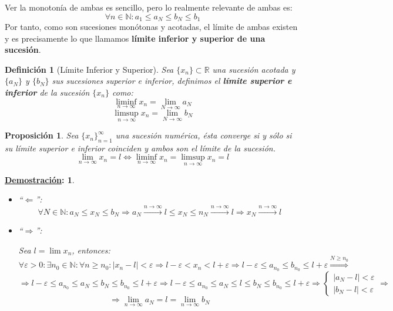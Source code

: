 \documentclass[10pt,a4paper,openright]{book}
\theoremstyle{break}
\newtheorem*{defi}{Definición}
\newtheorem*{prop}{Proposición}
\newtheorem*{demo}{\underline{Demostración}:}
\begin{document}
Ver la monotonía de ambas es sencillo, pero lo realmente relevante de ambas es:
$$\forall n\in \mathbb N: a_1\leq a_N\leq b_N\leq b_1$$
Por tanto, como son sucesiones monótonas y acotadas, el límite de ambas existen y es precisamente lo que llamamos \textbf{límite inferior y superior de una sucesión}.
\begin{defi}[Límite Inferior y Superior]
Sea $\{x_n\}\subset \mathbb R$ una sucesión acotada y $\{a_N\}$ y $\{b_N\}$ sus sucesiones superior e inferior, definimos el \textbf{límite superior e inferior} de la sucesión $\{x_n\}$ como:
$$\liminf_{n\rightarrow\infty}x_n=\lim_{N\rightarrow\infty}a_N$$
$$\limsup_{n\rightarrow\infty}x_n=\lim_{N\rightarrow\infty}b_N$$
\end{defi}

\begin{prop}
Sea $\{x_n\}_{n=1}^\infty$ una sucesión numérica, ésta converge si y sólo si su límite superior e inferior coinciden y ambos son el límite de la sucesión.
$$\lim_{n\rightarrow \infty}x_n=l\Leftrightarrow \liminf_{n\rightarrow\infty}x_n= \limsup_{n\rightarrow\infty}x_n=l$$
\end{prop}
\begin{demo}
\begin{itemize}
\item ``$\Leftarrow$'':
$$\forall N\in \mathbb N: a_N\leq x_N \leq b_N\Rightarrow a_N\xrightarrow{n\rightarrow\infty} l\leq x_N\leq n_N\xrightarrow{n\rightarrow\infty} l\Rightarrow x_N\xrightarrow{n\rightarrow\infty} l$$

\item ``$\Rightarrow$'':\par
Sea $l=\lim x_n$, entonces:
$$\forall \varepsilon>0: \exists n_0\in \mathbb N : \forall n\geq n_0: |x_n-l|<\varepsilon\Rightarrow l-\varepsilon <x_n<l+\varepsilon\Rightarrow l-\varepsilon \leq a_{n_0} \leq b_{n_0}\leq l+\varepsilon\stackrel{N\geq n_0}{\Rightarrow}$$
$$\Rightarrow l-\varepsilon \leq a_{n_0} \leq a_N \leq b_N \leq b_{n_0} \leq l+\varepsilon\Rightarrow l-\varepsilon \leq a_{n_0} \leq a_N \leq l\leq b_N \leq b_{n_0} \leq l+\varepsilon\Rightarrow \begin{cases}|a_N-l|<\varepsilon \\ |b_N-l|<\varepsilon \end{cases}\Rightarrow$$
$$\Rightarrow \lim_{n\rightarrow\infty}a_N=l= \lim_{n\rightarrow\infty}b_N$$
\end{itemize}
\end{demo}
\end{document}
